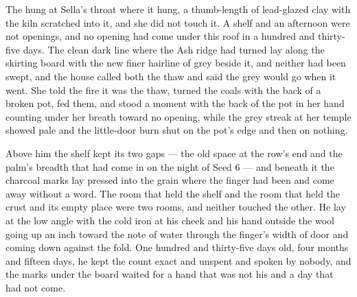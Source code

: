 The  hung at Sella's throat where it hung, a thumb-length of lead-glazed clay with the kiln scratched into it, and she did not touch it. A shelf and an afternoon were not openings, and no opening had come under this roof in a hundred and thirty-five days. The clean dark line where the Ash ridge had turned lay along the skirting board with the new finer hairline of grey beside it, and neither had been swept, and the house called both the thaw and said the grey would go when it went. She told the fire it was the thaw, turned the coals with the back of a broken pot, fed them, and stood a moment with the back of the pot in her hand counting under her breath toward no opening, while the grey streak at her temple showed pale and the little-door burn shut on the pot's edge and then on nothing.

Above him the shelf kept its two gaps --- the old space at the row's end and the palm's breadth that had come in on the night of Seed 6 --- and beneath it the charcoal marks lay pressed into the grain where the finger had been and come away without a word. The room that held the shelf and the room that held the crust and its empty place were two rooms, and neither touched the other. He lay at the low angle with the cold iron at his cheek and his hand outside the wool going up an inch toward the note of water through the finger's width of door and coming down against the fold. One hundred and thirty-five days old, four months and fifteen days, he kept the count exact and unspent and spoken by nobody, and the marks under the board waited for a hand that was not his and a day that had not come.
